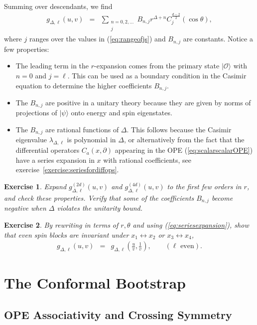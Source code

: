 \documentclass[11pt]{ws-rv9x6}
\newcommand\be{\begin{eqnarray}}
\newcommand\ee{\end{eqnarray}}
\newcommand\cO{\mathcal{O}}
\newcommand\p[1]{\left(#1\right)}
\newcommand\ptl\partial
\newcommand\<\langle
\renewcommand\>\rangle
\renewcommand\.{\cdot}
\newcommand\De{\Delta}
\renewcommand\l\lambda
\renewcommand\th{\theta}
\newtheorem{exercise}{Exercise}[section]
\begin{document}
Summing over descendants, we find
\be
\label{eq:seriesexpansion}
g_{\De,\ell}(u,v) &=& \sum_{\substack{n=0,2,\dots \\ j}} B_{n,j}r^{\De+n}C_j^{\frac{d-2}{2}}(\cos\th),\label{eq:seriesforblock}
\ee
where $j$ ranges over the values in (\ref{eq:rangeofjs}) and $B_{n,j}$ are constants.  
Notice a few properties:
\begin{itemize}
\item The leading term in the $r$-expansion comes from the primary state $|\cO\>$ with $n=0$ and $j=\ell$. This can be used as a boundary condition in the Casimir equation to determine the higher coefficients $B_{n,j}$.
\item The $B_{n,j}$ are positive in a unitary theory because they are given by norms of projections of $|\psi\>$ onto energy and spin eigenstates.
\item The $B_{n,j}$ are rational functions of $\De$.  This follows because the Casimir eigenvalue $\l_{\De,\ell}$ is polynomial in $\De$, or alternatively from the fact that the differential operators $C_a(x,\ptl)$ appearing in the OPE (\ref{eq:scalarscalarOPE}) have a series expansion in $x$ with rational coefficients, see exercise~\ref{exercise:seriesfordiffops}. 
\end{itemize}

\begin{exercise}
Expand $g^{(2d)}_{\De,\ell}(u,v)$ and $g^{(4d)}_{\De,\ell}(u,v)$ to the first few orders in $r$, and check these properties.  Verify that some of the coefficients $B_{n,j}$ become negative when $\De$ violates the unitarity bound.
\end{exercise}

\begin{exercise}
By rewriting in terms of $r,\th$ and using (\ref{eq:seriesexpansion}), show that even spin blocks are invariant under $x_1\leftrightarrow x_2$ or $x_3\leftrightarrow x_4$,
\be
\label{eq:invariantunderonetwo}
g_{\De,\ell}(u,v) &=& g_{\De,\ell}\p{\frac{u}{v},\frac 1 v},\qquad(\textrm{$\ell$ even}).
\ee
\end{exercise}

\section{The Conformal Bootstrap}

\subsection{OPE Associativity and Crossing Symmetry}
\end{document}
